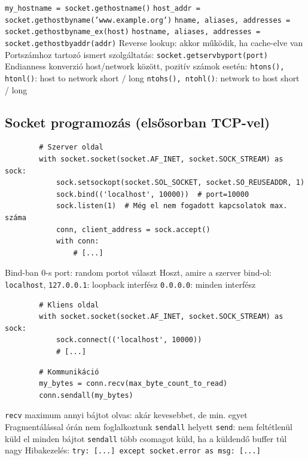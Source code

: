 \documentclass[12pt,a4paper]{article}
\begin{document}
\begin{outline}
	\1 \texttt{my\_hostname = socket.gethostname()}
	\1 \texttt{host\_addr = socket.gethostbyname('www.example.org')}
		\2 \texttt{hname, aliases, addresses = socket.gethostbyname\_ex(host)}
	\1 \texttt{hostname, aliases, addresses = socket.gethostbyaddr(addr)}
		\2 Reverse lookup: akkor működik, ha cache-elve van
	\1 Portszámhoz tartozó ismert szolgáltatás: \texttt{socket.getservbyport(port)}
	\1 Endianness konverzió host/network között, pozitív számok esetén:
		\2 \texttt{htons(), htonl()}: host to network short / long
		\2 \texttt{ntohs(), ntohl()}: network to host short / long
\end{outline}

\pagebreak

\subsection{Socket programozás (elsősorban TCP-vel)}

\begin{outline}
	\1 \begin{verbatim}
		# Szerver oldal
		with socket.socket(socket.AF_INET, socket.SOCK_STREAM) as sock:
		    sock.setsockopt(socket.SOL_SOCKET, socket.SO_REUSEADDR, 1)
		    sock.bind(('localhost', 10000))  # port=10000
		    sock.listen(1)  # Még el nem fogadott kapcsolatok max. száma
		    conn, client_address = sock.accept()
		    with conn:
		        # [...]
	\end{verbatim}
		\2 Bind-ban $0$-s port: random portot választ
		\2 Hoszt, amire a szerver bind-ol:
			\3 \texttt{localhost}, \texttt{127.0.0.1}: loopback interfész
			\3 \texttt{0.0.0.0}: minden interfész
	\1 \begin{verbatim}
		# Kliens oldal
		with socket.socket(socket.AF_INET, socket.SOCK_STREAM) as sock:
		    sock.connect(('localhost', 10000))
		    # [...]
	\end{verbatim}
	\1 \begin{verbatim}
		# Kommunikáció
		my_bytes = conn.recv(max_byte_count_to_read)
		conn.sendall(my_bytes)
	\end{verbatim}
		\2 \texttt{recv} maximum annyi bájtot olvas: akár kevesebbet, de min. egyet
			\3 Fragmentálással órán nem foglalkoztunk
		\2 \texttt{sendall} helyett \texttt{send}: nem feltétlenül küld el minden bájtot
		\2 \texttt{sendall} több csomagot küld, ha a küldendő buffer túl nagy
	\1 Hibakezelés: \texttt{try: [...] except socket.error as msg: [...]}
\end{outline}
\end{document}
